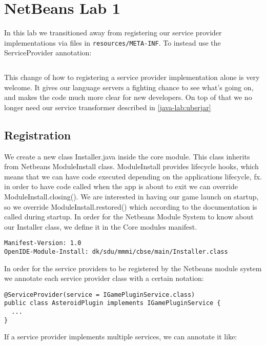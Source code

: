 \section{NetBeans Lab 1}

In this lab we transitioned away from registering our service provider
implementations via files in \texttt{resources/META-INF}. To instead use the
ServiceProvider annotation:

\inputminted{java}{code/openide-service-provider.java}

This change of how to registering a service provider implementation alone is
very welcome. It gives our language servers a fighting chance to see what's
going on, and makes the code much more clear for new developers. On top of that
we no longer need our service transformer described in \ref{java-lab:uberjar}


\subsection{Registration}
We create a new class Installer.java inside the core module. This class inherits
from Netbeans ModuleInstall class. ModuleInstall provides lifecycle hooks, which
means that we can have code executed depending on the applications lifecycle,
fx. in order to have code called when the app is about to exit we can override
ModuleInstall.closing(). We are interested in having our game launch on startup,
so we override ModuleInstall.restored() which according to the documentation
\cite{netbeans-module-install} is called during startup.
In order for the Netbeans Module System to know about our Installer class, we
define it in the Core modules manifest.

\begin{verbatim}
Manifest-Version: 1.0
OpenIDE-Module-Install: dk/sdu/mmmi/cbse/main/Installer.class
\end{verbatim}

In order for the service providers to be registered by the Netbeans module
system we annotate each service provider class with a certain notation:
\begin{verbatim}
@ServiceProvider(service = IGamePluginService.class)
public class AsteroidPlugin implements IGamePluginService {
  ...
}
\end{verbatim}

If a service provider implements multiple services, we can annotate it like:

